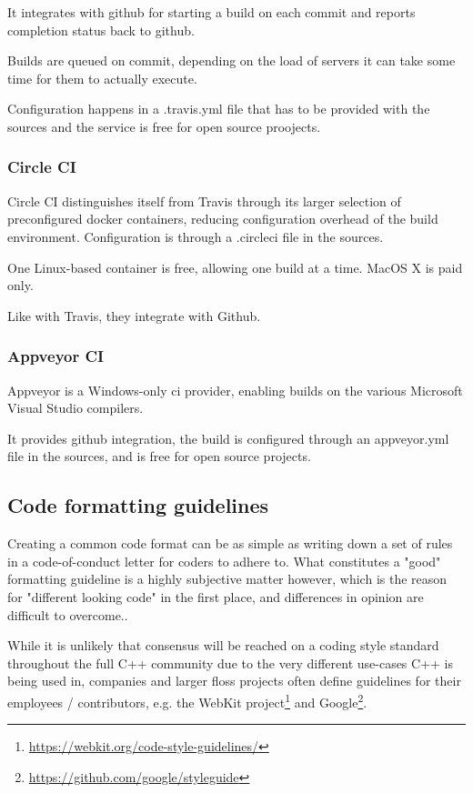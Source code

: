 It integrates with github for starting a build on each commit and reports completion status back to github.

Builds are queued on commit, depending on the load of servers it can take some time for them to actually execute.

Configuration happens in a .travis.yml file that has to be provided with the sources and the service is free for open source proojects.

\subsubsection{Circle CI}
Circle CI distinguishes itself from Travis through its larger selection of preconfigured docker containers, reducing configuration overhead of the build environment.
Configuration is through a .circleci file in the sources.

One Linux-based container is free, allowing one build at a time. MacOS X is paid only.

Like with Travis, they integrate with Github.

\subsubsection{Appveyor CI}
Appveyor is a Windows-only \gls{ci} provider, enabling builds on the various Microsoft Visual Studio compilers.

It provides github integration, the build is configured through an appveyor.yml file in the sources, and is free for open source projects.

\subsection{Code formatting guidelines}
\label{sec:resformat}
Creating a common code format can be as simple as writing down a set of rules in a code-of-conduct letter for coders to adhere to. What constitutes a "good" formatting guideline is a highly subjective matter however, which is the reason for "different looking code" in the first place, and differences in opinion are difficult to overcome..

While it is unlikely that consensus will be reached on a coding style standard throughout the full C++ community due to the very different use-cases C++ is being used in, companies and larger \gls{floss} projects often define guidelines for their employees / contributors,
e.g. the WebKit project\footnote{\url{https://webkit.org/code-style-guidelines/}} and Google\footnote{\url{https://github.com/google/styleguide}}.

